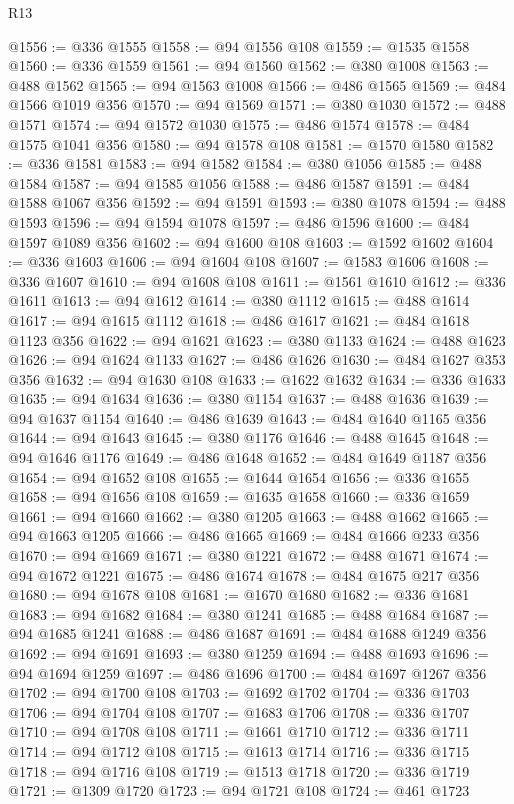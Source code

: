 \begin{lexlean}{R13}
\begin{coremodule}
@1556 := @336 @1555
@1558 := @94 @1556 @108
@1559 := @1535 @1558
@1560 := @336 @1559
@1561 := @94 @1560
@1562 := @380 @1008
@1563 := @488 @1562
@1565 := @94 @1563 @1008
@1566 := @486 @1565
@1569 := @484 @1566 @1019 @356
@1570 := @94 @1569
@1571 := @380 @1030
@1572 := @488 @1571
@1574 := @94 @1572 @1030
@1575 := @486 @1574
@1578 := @484 @1575 @1041 @356
@1580 := @94 @1578 @108
@1581 := @1570 @1580
@1582 := @336 @1581
@1583 := @94 @1582
@1584 := @380 @1056
@1585 := @488 @1584
@1587 := @94 @1585 @1056
@1588 := @486 @1587
@1591 := @484 @1588 @1067 @356
@1592 := @94 @1591
@1593 := @380 @1078
@1594 := @488 @1593
@1596 := @94 @1594 @1078
@1597 := @486 @1596
@1600 := @484 @1597 @1089 @356
@1602 := @94 @1600 @108
@1603 := @1592 @1602
@1604 := @336 @1603
@1606 := @94 @1604 @108
@1607 := @1583 @1606
@1608 := @336 @1607
@1610 := @94 @1608 @108
@1611 := @1561 @1610
@1612 := @336 @1611
@1613 := @94 @1612
@1614 := @380 @1112
@1615 := @488 @1614
@1617 := @94 @1615 @1112
@1618 := @486 @1617
@1621 := @484 @1618 @1123 @356
@1622 := @94 @1621
@1623 := @380 @1133
@1624 := @488 @1623
@1626 := @94 @1624 @1133
@1627 := @486 @1626
@1630 := @484 @1627 @353 @356
@1632 := @94 @1630 @108
@1633 := @1622 @1632
@1634 := @336 @1633
@1635 := @94 @1634
@1636 := @380 @1154
@1637 := @488 @1636
@1639 := @94 @1637 @1154
@1640 := @486 @1639
@1643 := @484 @1640 @1165 @356
@1644 := @94 @1643
@1645 := @380 @1176
@1646 := @488 @1645
@1648 := @94 @1646 @1176
@1649 := @486 @1648
@1652 := @484 @1649 @1187 @356
@1654 := @94 @1652 @108
@1655 := @1644 @1654
@1656 := @336 @1655
@1658 := @94 @1656 @108
@1659 := @1635 @1658
@1660 := @336 @1659
@1661 := @94 @1660
@1662 := @380 @1205
@1663 := @488 @1662
@1665 := @94 @1663 @1205
@1666 := @486 @1665
@1669 := @484 @1666 @233 @356
@1670 := @94 @1669
@1671 := @380 @1221
@1672 := @488 @1671
@1674 := @94 @1672 @1221
@1675 := @486 @1674
@1678 := @484 @1675 @217 @356
@1680 := @94 @1678 @108
@1681 := @1670 @1680
@1682 := @336 @1681
@1683 := @94 @1682
@1684 := @380 @1241
@1685 := @488 @1684
@1687 := @94 @1685 @1241
@1688 := @486 @1687
@1691 := @484 @1688 @1249 @356
@1692 := @94 @1691
@1693 := @380 @1259
@1694 := @488 @1693
@1696 := @94 @1694 @1259
@1697 := @486 @1696
@1700 := @484 @1697 @1267 @356
@1702 := @94 @1700 @108
@1703 := @1692 @1702
@1704 := @336 @1703
@1706 := @94 @1704 @108
@1707 := @1683 @1706
@1708 := @336 @1707
@1710 := @94 @1708 @108
@1711 := @1661 @1710
@1712 := @336 @1711
@1714 := @94 @1712 @108
@1715 := @1613 @1714
@1716 := @336 @1715
@1718 := @94 @1716 @108
@1719 := @1513 @1718
@1720 := @336 @1719
@1721 := @1309 @1720
@1723 := @94 @1721 @108
@1724 := @461 @1723

\end{coremodule}
\end{lexlean}
